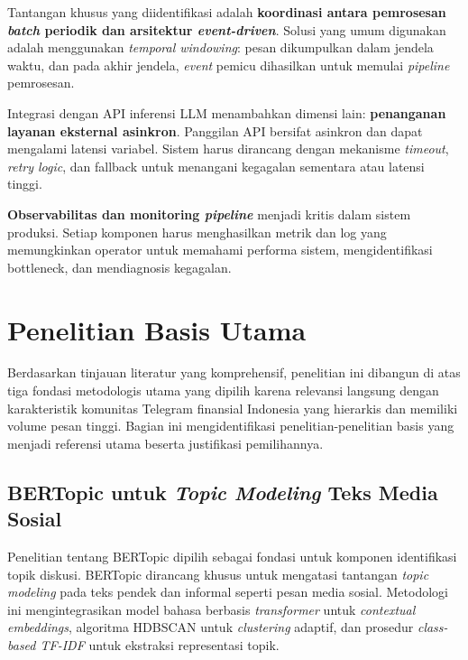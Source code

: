 Tantangan khusus yang diidentifikasi adalah \textbf{koordinasi antara pemrosesan \textit{batch} periodik dan arsitektur \textit{event-driven}}. Solusi yang umum digunakan adalah menggunakan \textit{temporal windowing}: pesan dikumpulkan dalam jendela waktu, dan pada akhir jendela, \textit{event} pemicu dihasilkan untuk memulai \textit{pipeline} pemrosesan.

Integrasi dengan API inferensi LLM menambahkan dimensi lain: \textbf{penanganan layanan eksternal asinkron}. Panggilan API bersifat asinkron dan dapat mengalami latensi variabel. Sistem harus dirancang dengan mekanisme \textit{timeout}, \textit{retry logic}, dan fallback untuk menangani kegagalan sementara atau latensi tinggi.

\textbf{Observabilitas dan monitoring \textit{pipeline}} menjadi kritis dalam sistem produksi. Setiap komponen harus menghasilkan metrik dan log yang memungkinkan operator untuk memahami performa sistem, mengidentifikasi bottleneck, dan mendiagnosis kegagalan.


\section{Penelitian Basis Utama}
\label{sec:research-foundation}

Berdasarkan tinjauan literatur yang komprehensif, penelitian ini dibangun di atas tiga fondasi metodologis utama yang dipilih karena relevansi langsung dengan karakteristik komunitas Telegram finansial Indonesia yang hierarkis dan memiliki volume pesan tinggi. Bagian ini mengidentifikasi penelitian-penelitian basis yang menjadi referensi utama beserta justifikasi pemilihannya.

\subsection{BERTopic untuk \textit{Topic Modeling} Teks Media Sosial}

Penelitian \textcite{grootendorst2022} tentang BERTopic dipilih sebagai fondasi untuk komponen identifikasi topik diskusi. BERTopic dirancang khusus untuk mengatasi tantangan \textit{topic modeling} pada teks pendek dan informal seperti pesan media sosial. Metodologi ini mengintegrasikan model bahasa berbasis \textit{transformer} untuk \textit{contextual embeddings}, algoritma HDBSCAN untuk \textit{clustering} adaptif, dan prosedur \textit{class-based TF-IDF} untuk ekstraksi representasi topik.

